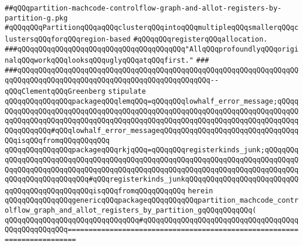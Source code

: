 \label{src/lib/compiler/back/low/regor/partition-machcode-controlflow-graph-and-allot-registers-by-partition-g.pkg}
\verb|##qQQqpartition-machcode-controlflow-graph-and-allot-registers-by-partition-g.pkg|\newline
\newline
\verb|#qQQqqQQqPartitionqQQqaqQQqclusterqQQqintoqQQqmultipleqQQqsmallerqQQqclustersqQQqforqQQqregion-based|\newline
\verb|#qQQqqQQqregisterqQQqallocation.|\newline
\newline
\newline
\newline
\verb|###qQQqqQQqqQQqqQQqqQQqqQQqqQQqqQQqqQQqqQQq"AllqQQqprofoundlyqQQqoriginalqQQqworkqQQqlooksqQQquglyqQQqatqQQqfirst."|\newline
\verb|###|\newline
\verb|###qQQqqQQqqQQqqQQqqQQqqQQqqQQqqQQqqQQqqQQqqQQqqQQqqQQqqQQqqQQqqQQqqQQqqQQqqQQqqQQqqQQqqQQqqQQqqQQqqQQqqQQqqQQqqQQqqQQq--qQQqClementqQQqGreenberg|\newline
\newline
\newline
\verb|stipulate|\newline
\verb|qQQqqQQqqQQqqQQqpackageqQQqlemqQQq=qQQqqQQqlowhalf_error_message;qQQqqQQqqQQqqQQqqQQqqQQqqQQqqQQqqQQqqQQqqQQqqQQqqQQqqQQqqQQqqQQqqQQqqQQqqQQqqQQqqQQqqQQqqQQqqQQqqQQqqQQqqQQqqQQqqQQqqQQqqQQqqQQqqQQqqQQqqQQqqQQqqQQqqQQqqQQq#qQQqlowhalf_error_messageqQQqqQQqqQQqqQQqqQQqqQQqqQQqqQQqqQQqisqQQqfromqQQqqQQqqQQq|\newline
\verb|qQQqqQQqqQQqqQQqpackageqQQqrkjqQQq=qQQqqQQqregisterkinds_junk;qQQqqQQqqQQqqQQqqQQqqQQqqQQqqQQqqQQqqQQqqQQqqQQqqQQqqQQqqQQqqQQqqQQqqQQqqQQqqQQqqQQqqQQqqQQqqQQqqQQqqQQqqQQqqQQqqQQqqQQqqQQqqQQqqQQqqQQqqQQqqQQqqQQqqQQqqQQqqQQqqQQqqQQq#qQQqregisterkinds_junkqQQqqQQqqQQqqQQqqQQqqQQqqQQqqQQqqQQqqQQqqQQqqQQqisqQQqfromqQQqqQQqqQQq|\newline
\verb|herein|\newline
\newline
\verb|qQQqqQQqqQQqqQQqgenericqQQqpackageqQQqqQQqqQQqpartition_machcode_controlflow_graph_and_allot_registers_by_partition_gqQQqqQQqqQQq(|\newline
\verb|qQQqqQQqqQQqqQQqqQQqqQQqqQQqqQQq#qQQqqQQqqQQqqQQqqQQqqQQqqQQqqQQqqQQqqQQqqQQqqQQqqQQq========================================================================|\newline
